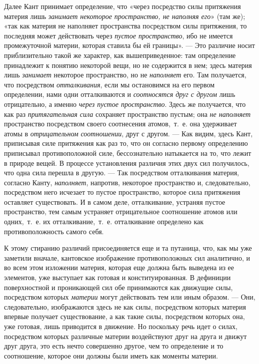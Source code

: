 Далее Кант принимает определение, что «через посредство силы притяжения
материя лишь {\em занимает некоторое пространство, не
наполняя его}» (там же); «так как материя не наполняет пространства
посредством силы притяжения, то последняя может действовать через
{\em пустое пространство}, ибо не имеется промежуточной
материи, которая ставила бы ей границы». — Это различие носит
приблизительно такой же характер, как вышеприведенное: там определение
принадлежит к понятию некоторой вещи, но не содержится в нем; здесь материя
лишь {\em занимает} некоторое пространство, но не
{\em наполняет} его. Там получается, что посредством
{\em отталкивания}, если мы остановимся на его первом
определении, нами одни отталкиваются и {\em соотносятся
друг с другом} лишь отрицательно, а именно {\em через
пустое пространство}. Здесь же получается, что как раз
{\em притягательная сила} сохраняет пространство
пустым; она {\em не наполняет} пространство посредством
своего соотнесения атомов,~т.~е. она удерживает атомы в
{\em отрицательном}
{\em соотношении}, друг с другом. — Как видим, здесь
Кант, приписывая силе притяжения как раз то, что он согласно первому
определению приписывал противоположной силе, бессознательно натыкается на
то, что лежит в природе вещей. В процессе установления различия этих двух
сил получилось, что одна сила перешла в другую. — Так посредством
отталкивания материя, согласно Канту, {\em наполняет},
напротив, некоторое пространство и, следовательно, посредством него
исчезает то пустое пространство, которое сила притяжения оставляет
существовать. И в самом деле, отталкивание, устраняя пустое пространство,
тем самым устраняет отрицательное соотношение атомов или одних,~т.~е. их
отталкивание,~т.~е. отталкивание определено как противоположность самого
себя.

К этому стиранию различий присоединяется еще и та путаница, что, как мы уже
заметили вначале, кантовское изображение противоположных сил аналитично, и
во всем этом изложении материя, которая еще должна быть выведена из ее
элементов, уже выступает как готовая и конституированная. В дефиниции
поверхностной и проникающей сил обе принимаются как движущие силы,
посредством которых {\em материи} могут действовать тем
или иным образом. — Они, следовательно, изображаются здесь не как силы,
посредством которых материя впервые получает существование, а как такие
силы, посредством которых она, уже готовая, лишь приводится в движение. Но
поскольку речь идет о силах, посредством которых различные материи
воздействуют друг на друга и движут друг друга, это есть нечто совершенно
другое, чем то определение и то соотношение, которое они должны были иметь
как моменты материи.

